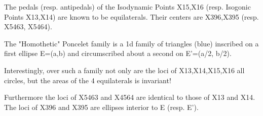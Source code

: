 The pedals (resp. antipedals) of the Isodynamic Points X15,X16 (resp. Isogonic Points X13,X14) are known to be equilaterals. Their centers are X396,X395 (resp. X5463, X5464).

The "Homothetic" Poncelet family is a 1d family of triangles (blue) inscribed on a first ellipse E=(a,b) and circumscribed about a second on E'=(a/2, b/2).

Interestingly, over such a family not only are the loci of X13,X14,X15,X16 all circles, but the areas of the 4 equilaterals is invariant!

Furthermore the loci of X5463 and X4564 are identical to those of X13 and X14. The loci of X396 and X395 are ellipses interior to E (resp. E').